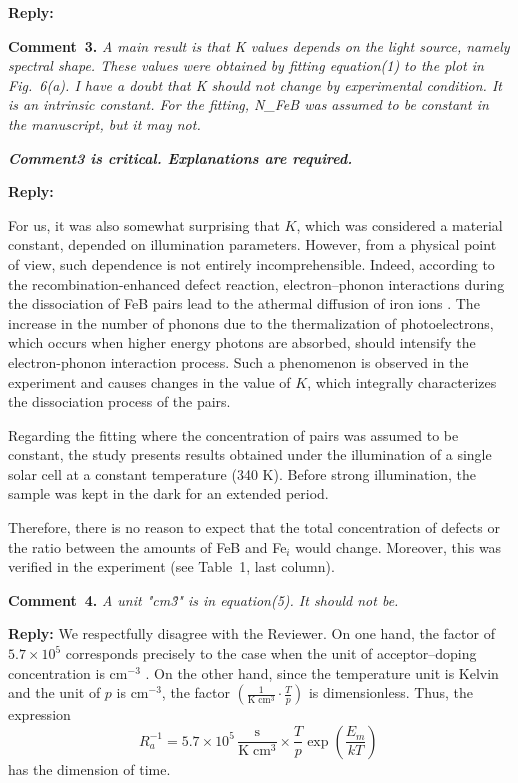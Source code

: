 \documentclass{WileyMSP-template}
\begin{document}
\noindent
\textcolor[rgb]{0.51,0.00,0.00}{\textbf{Reply:}}


\vspace{1cm}
\noindent
\textcolor[rgb]{0.00,0.50,1.00}{\textbf{Comment~3.}}
\emph{A main result is that K values depends on the light source, namely spectral shape.
These values were obtained by fitting equation(1) to the plot in Fig.~6(a).
I have a doubt that K should not change by experimental condition.
It is an intrinsic constant.
For the fitting, N\_FeB was assumed to be constant in the manuscript, but it may not.}

\emph{
\textbf{Comment3 is critical. Explanations are required.}
}

\noindent
\textcolor[rgb]{0.51,0.00,0.00}{\textbf{Reply:}}


For us, it was also somewhat surprising that $K$, 
which was considered a material constant, depended on illumination parameters. 
However, from a physical point of view, such dependence is not entirely incomprehensible.
Indeed, according to the recombination-enhanced defect reaction, 
electron--phonon interactions during the dissociation of FeB pairs lead to the athermal diffusion of iron ions \cite{FeBKin2019,KIMERLINGFeB}. 
The increase in the number of phonons due to the thermalization of photoelectrons, 
which occurs when higher energy photons are absorbed, 
should intensify the electron-phonon interaction process.
Such a phenomenon is observed in the experiment and causes changes in the value of $K$, 
which integrally characterizes the dissociation process of the pairs.

Regarding the fitting where the concentration of pairs was assumed to be constant, 
the study presents results obtained under the illumination of a single solar cell at a constant temperature (340 K). 
Before strong illumination, the sample was kept in the dark for an extended period.

Therefore, there is no reason to expect that the total concentration of defects or the ratio between the amounts 
of FeB and Fe$_i$ would change.
Moreover, this was verified in the experiment (see Table~1, last column).


\vspace{1cm}
\noindent
\textcolor[rgb]{0.00,0.50,1.00}{\textbf{Comment~4.}}
\emph{A unit "cm\^3" is in equation(5). It should not be.}

\noindent
\textcolor[rgb]{0.51,0.00,0.00}{\textbf{Reply:}}
We respectfully disagree with the Reviewer.
On one hand, the factor of $5.7\times10^5$
corresponds precisely to the case
when the unit of acceptor--doping concentration is cm$^{-3}$ \cite{FeBAssJAP2014,FeBKin2019,FeBAssSST2011}.
On the other hand,
since the temperature unit is Kelvin
and the unit of $p$ is cm$^{-3}$,
the factor $\left(\frac{1}{\mathrm{K}\;\mathrm{cm}^3}\cdot\frac{T}{p}\right)$ is dimensionless.
Thus, the expression
\begin{equation}
\label{eqTass}
R_a^{-1}=5.7\times10^5\,\frac{\mathrm{s}}{\mathrm{K}\;\mathrm{cm}^3}\times\frac{T}{p}\exp\left(\frac{E_m}{kT}\right)\,
\end{equation}
has the dimension of time.
\end{document}
